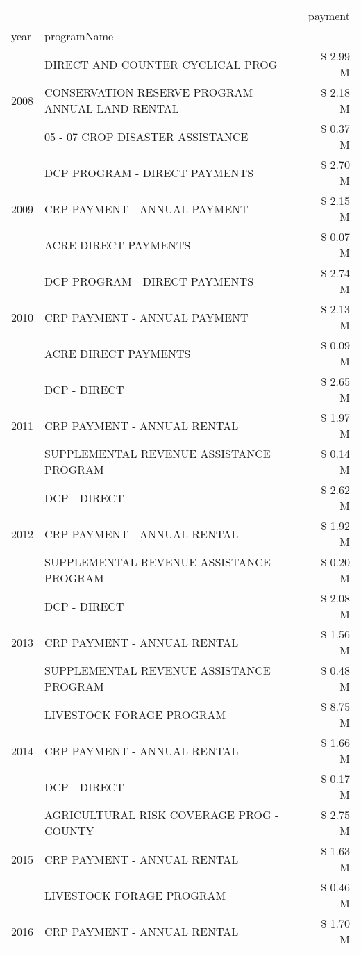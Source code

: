 \begin{tabular}{llr}
\toprule
 &  & payment \\
year & programName &  \\
\midrule
\multirow[t]{3}{*}{2008} & DIRECT AND COUNTER CYCLICAL PROG & \$ 2.99 M \\
 & CONSERVATION RESERVE PROGRAM - ANNUAL LAND RENTAL & \$ 2.18 M \\
 & 05 - 07 CROP DISASTER ASSISTANCE & \$ 0.37 M \\
\cline{1-3}
\multirow[t]{3}{*}{2009} & DCP PROGRAM - DIRECT PAYMENTS & \$ 2.70 M \\
 & CRP PAYMENT - ANNUAL PAYMENT & \$ 2.15 M \\
 & ACRE DIRECT PAYMENTS & \$ 0.07 M \\
\cline{1-3}
\multirow[t]{3}{*}{2010} & DCP PROGRAM - DIRECT PAYMENTS & \$ 2.74 M \\
 & CRP PAYMENT - ANNUAL PAYMENT & \$ 2.13 M \\
 & ACRE DIRECT PAYMENTS & \$ 0.09 M \\
\cline{1-3}
\multirow[t]{3}{*}{2011} & DCP - DIRECT & \$ 2.65 M \\
 & CRP PAYMENT - ANNUAL RENTAL & \$ 1.97 M \\
 & SUPPLEMENTAL REVENUE ASSISTANCE PROGRAM & \$ 0.14 M \\
\cline{1-3}
\multirow[t]{3}{*}{2012} & DCP - DIRECT & \$ 2.62 M \\
 & CRP PAYMENT - ANNUAL RENTAL & \$ 1.92 M \\
 & SUPPLEMENTAL REVENUE ASSISTANCE PROGRAM & \$ 0.20 M \\
\cline{1-3}
\multirow[t]{3}{*}{2013} & DCP - DIRECT & \$ 2.08 M \\
 & CRP PAYMENT - ANNUAL RENTAL & \$ 1.56 M \\
 & SUPPLEMENTAL REVENUE ASSISTANCE PROGRAM & \$ 0.48 M \\
\cline{1-3}
\multirow[t]{3}{*}{2014} & LIVESTOCK FORAGE PROGRAM & \$ 8.75 M \\
 & CRP PAYMENT - ANNUAL RENTAL & \$ 1.66 M \\
 & DCP - DIRECT & \$ 0.17 M \\
\cline{1-3}
\multirow[t]{3}{*}{2015} & AGRICULTURAL RISK COVERAGE PROG - COUNTY & \$ 2.75 M \\
 & CRP PAYMENT - ANNUAL RENTAL & \$ 1.63 M \\
 & LIVESTOCK FORAGE PROGRAM & \$ 0.46 M \\
\cline{1-3}
\multirow[t]{3}{*}{2016} & CRP PAYMENT - ANNUAL RENTAL & \$ 1.70 M \\

\end{tabular}
